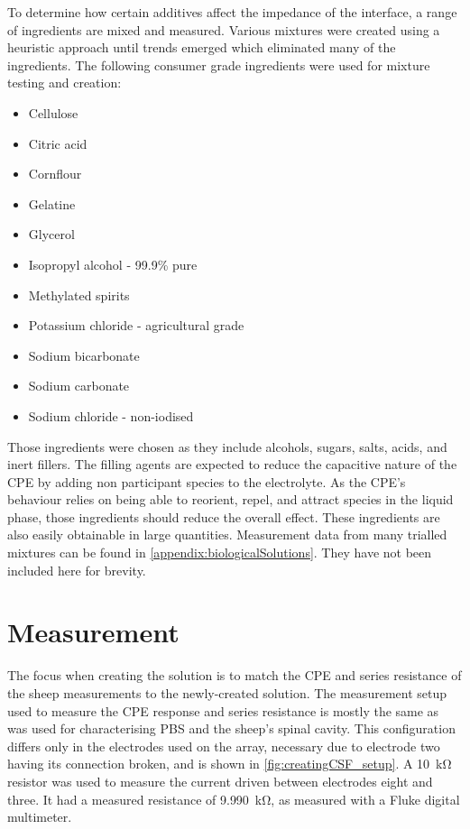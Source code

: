   To determine how certain additives affect the impedance of the interface, a range of ingredients are mixed and measured.
  Various mixtures were created using a heuristic approach until trends emerged which eliminated many of the ingredients.
  The following consumer grade ingredients were used for mixture testing and creation:
  \begin{itemize}
    \label{review:listOfIngredients}
      \item Cellulose
      \item Citric acid
      \item Cornflour
      \item Gelatine
      \item Glycerol
      \item Isopropyl alcohol - 99.9\% pure
      \item Methylated spirits
      \item Potassium chloride - agricultural grade
      \item Sodium bicarbonate
      \item Sodium carbonate
      \item Sodium chloride - non-iodised
  \end{itemize}

  Those ingredients were chosen as they include alcohols, sugars, salts, acids, and inert fillers.
  The filling agents are expected to reduce the capacitive nature of the CPE by adding non participant species to the electrolyte.
  As the CPE's behaviour relies on being able to reorient, repel, and attract species in the liquid phase, those ingredients should reduce the overall effect.
  These ingredients are also easily obtainable in large quantities.
  Measurement data from many trialled mixtures can be found in \cref{appendix:biologicalSolutions}.
  They have not been included here for brevity.

\section{Measurement}

  The focus when creating the solution is to match the CPE and series resistance of the sheep measurements to the newly-created solution.
  The measurement setup used to measure the CPE response and series resistance is mostly the same as was used for characterising PBS and the sheep's spinal cavity.
  This configuration differs only in the electrodes used on the array, necessary due to electrode two having its connection broken, and is shown in \cref{fig:creatingCSF_setup}.
  A \SI{10}{\kilo\ohm} resistor was used to measure the current driven between electrodes eight and three.
  It had a measured resistance of \SI{9.990}{\kilo\ohm}, as measured with a Fluke digital multimeter.

